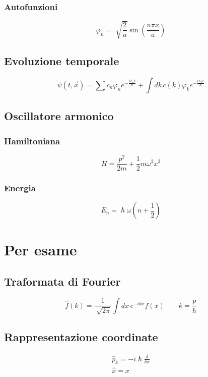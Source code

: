 \subsection{Autofunzioni}
\begin{equation*}
    \varphi_n = \sqrt[]{\frac{2}{a}}\sin\left(\frac{n\pi x}{a}\right)
\end{equation*}

\section{Evoluzione temporale}
\begin{equation*}
    \psi(t,\vec{x}) = \sum c_n\varphi_n e^{-\frac{iE_nt}{\hslash}} + \int dk \, c(k)\varphi_ke^{-\frac{iE_kt}{\hslash}}
\end{equation*}

\section{Oscillatore armonico}
\subsection{Hamiltoniana}
\begin{equation*}
    H = \frac{p^2}{2m} + \frac{1}{2}m\omega^2x^2
\end{equation*}

\subsection{Energia}
\begin{equation*}
    E_n = \hslash\omega \left(n + \frac{1}{2}\right)
\end{equation*}

\chapter{Per esame}

\section{Traformata di Fourier}
\begin{equation*}
    \hat{f}(k) = \frac{1}{\sqrt[]{2\pi}} \int dx \, e^{-ikx}f(x) \qquad k = \frac{p}{\hslash}
\end{equation*}

\section{Rappresentazione coordinate}
\begin{gather*}
    \hat{p}_x = -i\hslash \frac{\delta}{\delta x} \\
    \hat{x} = x 
\end{gather*}

